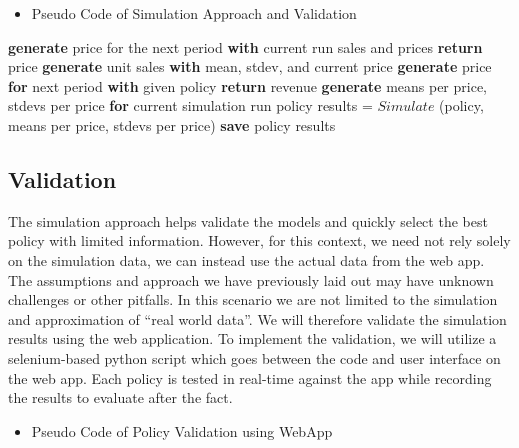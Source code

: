 \documentclass[11pt,a4paper]{article}
\begin{document}
\begin{itemize}[leftmargin=*]
    \item Pseudo Code of Simulation Approach and Validation
\end{itemize}

\begin{algorithmic}[1]
        \State \textbf{generate} price for the next period \textbf{with} current run sales and prices
        \State \textbf{return} price
    \EndProcedure
    \State
            \State \textbf{generate} unit sales \textbf{with} mean, stdev, and current price
            \State \textbf{generate} price \textbf{for} next period \textbf{with} given policy
        \EndFor
        \State \textbf{return} revenue
    \EndProcedure 
    \State
            \State \textbf{generate} means per price, stdevs per price \textbf{for} current simulation run 
            \State policy results = $Simulate$ (policy, means per price, stdevs per price) 
            \State \textbf{save} policy results
        \EndFor
    \EndFor
\end{algorithmic}

\subsection{Validation}
The simulation approach helps validate the models and quickly select the best policy with limited information. 
However, for this context, we need not rely solely on the simulation data, we can instead use the actual data from the web app. 
The assumptions and approach we have previously laid out may have unknown challenges or other pitfalls. 
In this scenario we are not limited to the simulation and approximation of “real world data”. 
We will therefore validate the simulation results using the web application. 
To implement the validation, we will utilize a selenium-based python script which goes between the code and user interface on the web app. 
Each policy is tested in real-time against the app while recording the results to evaluate after the fact. 

\begin{itemize}[leftmargin=*]
    \item Pseudo Code of Policy Validation using WebApp
\end{itemize}
\end{document}
